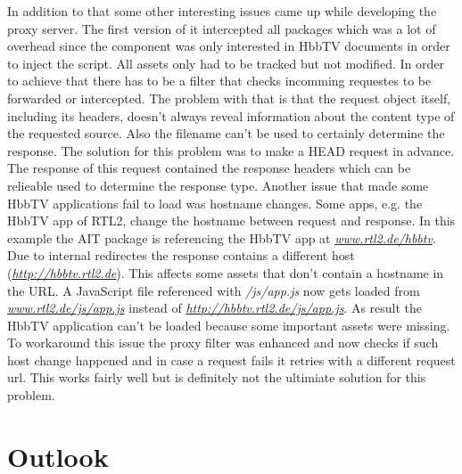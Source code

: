 In addition to that some other interesting issues came up while developing the proxy server. The first version of it
intercepted all packages which was a lot of overhead since the component was only interested in HbbTV documents in
order to inject the script. All assets only had to be tracked but not modified. In order to achieve that there has
to be a filter that checks incomming requestes to be forwarded or intercepted. The problem with that is that the
request object itself, including its headers, doesn't always reveal information about the content type of the requested
source. Also the filename can't be used to certainly determine the response. The solution for this problem was to make
a HEAD request in advance. The response of this request contained the response headers which can be relieable used
to determine the response type. Another issue that made some HbbTV applications fail to load was hostname changes.
Some apps, e.g. the HbbTV app of RTL2, change the hostname between request and response. In this example the AIT
package is referencing the HbbTV app at \textit{\url{www.rtl2.de/hbbtv}}. Due to internal redirectes the response
contains a different host (\textit{\url{http://hbbtv.rtl2.de}}). This affects some assets that don't contain a hostname
in the URL. A JavaScript file referenced with \textit{/js/app.js} now gets loaded from \textit{\url{www.rtl2.de/js/app.js}}
instead of \textit{\url{http://hbbtv.rtl2.de/js/app.js}}. As result the HbbTV application can't be loaded because
some important assets were missing. To workaround this issue the proxy filter was enhanced and now checks if such
host change happened and in case a request fails it retries with a different request url. This works fairly well
but is definitely not the ultimiate solution for this problem.

\section{Outlook\label{sec:outlook}}

